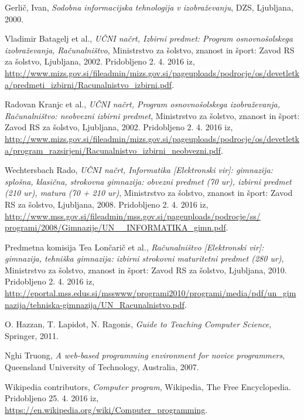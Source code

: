 \begin{thebibliography}{100}

 Gerlič, Ivan, \emph{Sodobna informacijska tehnologija v
    izobraževanju}, DZS, Ljubljana, 2000.

 Vladimir Batagelj et al., \emph{UČNI
    načrt, Izbirni predmet: Program osnovnošolskega izobraževanja,
    Računalništvo}, Ministrstvo za šolstvo, znanost in šport: Zavod RS
  za šolstvo, Ljubljana, 2002. Pridobljeno 2. 4. 2016 iz,
  \url{http://www.mizs.gov.si/fileadmin/mizs.gov.si/pageuploads/podrocje/os/devetletka/predmeti_izbirni/Racunalnistvo_izbirni.pdf}.

 Radovan Kranjc et al., \emph{UČNI
    načrt, Program osnovnošolskega izobraževanja, Računalništvo:
    neobvezni izbirni predmet}, Ministrstvo za šolstvo, znanost in
  šport: Zavod RS za šolstvo, Ljubljana, 2002. Pridobljeno 2. 4. 2016
  iz,
  \url{http://www.mizs.gov.si/fileadmin/mizs.gov.si/pageuploads/podrocje/os/devetletka/program_razsirjeni/Racunalnistvo_izbirni_neobvezni.pdf}.

 Wechtersbach Rado, \emph{UČNI
    načrt, Informatika [Elektronski vir]: gimnazija: splošna,
    klasična, strokovna gimnazija: obvezni predmet (70 ur), izbirni
    predmet (210 ur), matura (70 + 210 ur)}, Ministrstvo za šolstvo,
  znanost in šport: Zavod RS za šolstvo, Ljubljana, 2008. Pridobljeno
  2. 4. 2016 iz,
  \url{http://www.mss.gov.si/fileadmin/mss.gov.si/pageuploads/podrocje/ss/ programi/2008/Gimnazije/UN__INFORMATIKA_gimn.pdf}.

 Predmetna komisija Tea Lončarič et al.,
  \emph{Računalništvo [Elektronski vir]: gimnazija, tehniška
    gimnazija: izbirni strokovni maturitetni predmet (280 ur)},
  Ministrstvo za šolstvo, znanost in šport: Zavod RS za šolstvo,
  Ljubljana, 2010. Pridobljeno 2. 4. 2016 iz,
  \url{http://eportal.mss.edus.si/msswww/programi2010/programi/media/pdf/un_gimnazija/tehniska-gimnazija/UN_Racunalnistvo.pdf}.

 O. Hazzan, T. Lapidot, N. Ragonis,
  \emph{Guide to Teaching Computer Science}, Springer, 2011.

 Nghi Truong,
  \emph{A web-based programming environment for novice programmers},
  Queensland University of Technology, Australia, 2007.

 Wikipedia contributors, \emph{Computer
    program}, Wikipedia, The Free Encyclopedia. Pridobljeno 25. 4. 2016
  iz,
  \url{https://en.wikipedia.org/wiki/Computer_programming}.


\end{thebibliography}
